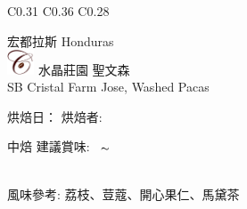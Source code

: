 \documentclass[10pt,a4paper]{article}
\begin{document}
\begin{tabular}{C{0.31\textwidth} C{0.36\textwidth} C{0.28\textwidth}}
{{宏都拉斯 %
\large
Honduras%
}\\
{ \hspace*{-0.66cm}\includegraphics[trim=0 20em 0 -20em,width=0.06\textwidth]{NEWC.png}%
\Large \hspace*{0.1em} \vspace*{0.15cm}  
\hspace*{0.4em}水晶莊園 聖文森%
}\vspace*{0.15em}\\
{ 
SB Cristal Farm Jose, Washed Pacas %
}\vspace*{0.25em}\\
\setdatetoday \addtocounter{datenumber}{
-11%
}\setdatebynumber{\thedatenumber}
{\scriptsize 烘焙日：{\scriptsize\datedate}\hspace{0.3em}%
烘焙者: \textbf{\scriptsize{}}}\vspace*{-0.3em}\\
 \addtocounter{datenumber}{
4 }%
\setdatebynumber{\thedatenumber} 
{\normalsize 
中焙%
\enskip \scriptsize 建議賞味:} \scriptsize{\datemonthname ~\thedateday}$\thicksim$\addtocounter{datenumber}{55}\setdatebynumber{\thedatenumber} \datedate
\\\scriptsize 風味參考: 荔枝、荳蔻、開心果仁、馬黛茶
}
\end{tabular}
\end{document}
